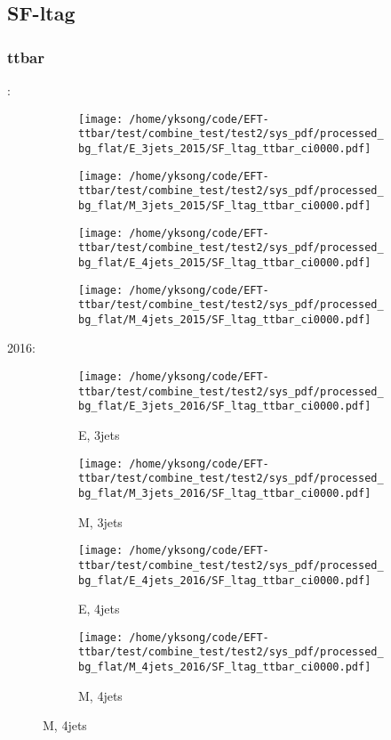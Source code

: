 \documentclass{beamer}
\begin{document}
\subsection{SF-ltag}

\begin{frame}
\frametitle{ttbar}
\fontsize{5}{1}:
\begin{figure}
\centering
\begin{subfigure}[b]{0.24\textwidth}
\texttt{[image: /home/yksong/code/EFT-ttbar/test/combine\_test/test2/sys\_pdf/processed\_bg\_flat/E\_3jets\_2015/SF\_ltag\_ttbar\_ci0000.pdf]}
\end{subfigure}
\begin{subfigure}[b]{0.24\textwidth}
\texttt{[image: /home/yksong/code/EFT-ttbar/test/combine\_test/test2/sys\_pdf/processed\_bg\_flat/M\_3jets\_2015/SF\_ltag\_ttbar\_ci0000.pdf]}
\end{subfigure}
\begin{subfigure}[b]{0.24\textwidth}
\texttt{[image: /home/yksong/code/EFT-ttbar/test/combine\_test/test2/sys\_pdf/processed\_bg\_flat/E\_4jets\_2015/SF\_ltag\_ttbar\_ci0000.pdf]}
\end{subfigure}
\begin{subfigure}[b]{0.24\textwidth}
\texttt{[image: /home/yksong/code/EFT-ttbar/test/combine\_test/test2/sys\_pdf/processed\_bg\_flat/M\_4jets\_2015/SF\_ltag\_ttbar\_ci0000.pdf]}
\end{subfigure}
\end{figure}
2016:
\begin{figure}
\centering
\begin{subfigure}[b]{0.24\textwidth}
\texttt{[image: /home/yksong/code/EFT-ttbar/test/combine\_test/test2/sys\_pdf/processed\_bg\_flat/E\_3jets\_2016/SF\_ltag\_ttbar\_ci0000.pdf]}
\captionsetup{font=tiny}
\caption{E, 3jets}
\end{subfigure}
\begin{subfigure}[b]{0.24\textwidth}
\texttt{[image: /home/yksong/code/EFT-ttbar/test/combine\_test/test2/sys\_pdf/processed\_bg\_flat/M\_3jets\_2016/SF\_ltag\_ttbar\_ci0000.pdf]}
\captionsetup{font=tiny}
\caption{M, 3jets}
\end{subfigure}
\begin{subfigure}[b]{0.24\textwidth}
\texttt{[image: /home/yksong/code/EFT-ttbar/test/combine\_test/test2/sys\_pdf/processed\_bg\_flat/E\_4jets\_2016/SF\_ltag\_ttbar\_ci0000.pdf]}
\captionsetup{font=tiny}
\caption{E, 4jets}
\end{subfigure}
\begin{subfigure}[b]{0.24\textwidth}
\texttt{[image: /home/yksong/code/EFT-ttbar/test/combine\_test/test2/sys\_pdf/processed\_bg\_flat/M\_4jets\_2016/SF\_ltag\_ttbar\_ci0000.pdf]}
\captionsetup{font=tiny}
\caption{M, 4jets}
\end{subfigure}
\end{figure}
\end{frame}
\end{document}
